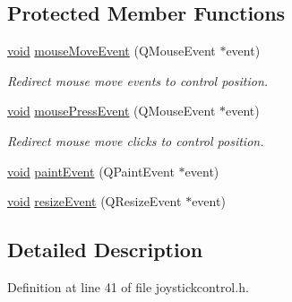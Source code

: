 \subsection*{\-Protected \-Member \-Functions}
\begin{DoxyCompactItemize}
\item 
\hyperlink{group___u_a_v_objects_plugin_ga444cf2ff3f0ecbe028adce838d373f5c}{void} \hyperlink{group___g_c_s_control_gadget_plugin_ga4522aafc5f2b7dae7d64ac4368189272}{mouse\-Move\-Event} (\-Q\-Mouse\-Event $\ast$event)
\begin{DoxyCompactList}\small\item\em \-Redirect mouse move events to control position. \end{DoxyCompactList}\item 
\hyperlink{group___u_a_v_objects_plugin_ga444cf2ff3f0ecbe028adce838d373f5c}{void} \hyperlink{group___g_c_s_control_gadget_plugin_ga8d3df6f8f57869a8e862f3844766ad72}{mouse\-Press\-Event} (\-Q\-Mouse\-Event $\ast$event)
\begin{DoxyCompactList}\small\item\em \-Redirect mouse move clicks to control position. \end{DoxyCompactList}\item 
\hyperlink{group___u_a_v_objects_plugin_ga444cf2ff3f0ecbe028adce838d373f5c}{void} \hyperlink{group___g_c_s_control_gadget_plugin_ga10ed4b7da97f80c638a3eec5a81344c8}{paint\-Event} (\-Q\-Paint\-Event $\ast$event)
\item 
\hyperlink{group___u_a_v_objects_plugin_ga444cf2ff3f0ecbe028adce838d373f5c}{void} \hyperlink{group___g_c_s_control_gadget_plugin_gaae12f9fa1f0456ecc47b044a2b2db9da}{resize\-Event} (\-Q\-Resize\-Event $\ast$event)
\end{DoxyCompactItemize}


\subsection{\-Detailed \-Description}


\-Definition at line 41 of file joystickcontrol.\-h.




